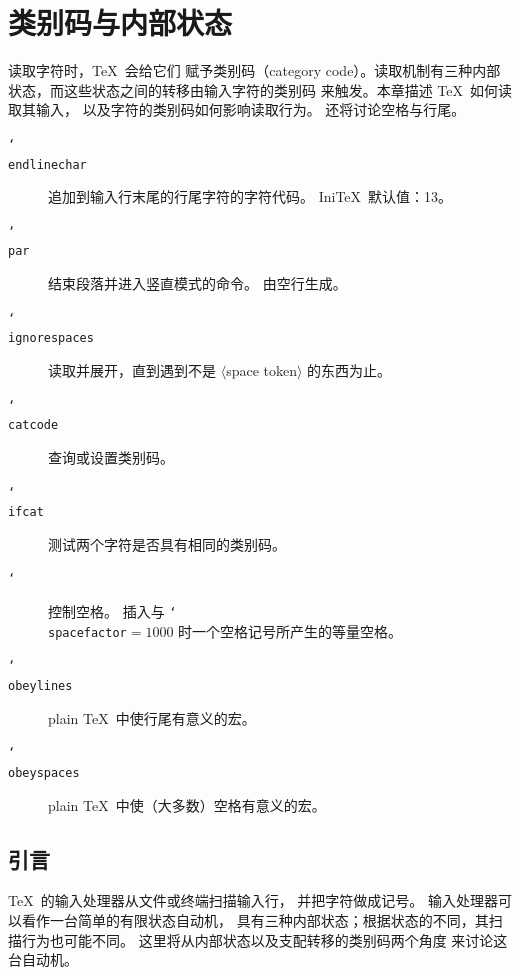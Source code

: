 \documentclass[a4paper]{rapport3}
\def\nl{\protect\\}\def\n#1{{\tt #1}}\def\cs#1{{\tt\char`\\#1}}\let\csc\cs
\def\gr#1{$\langle$#1$\rangle$}\def\key#1{{\tt#1}}
\def\IniTeX{Ini\TeX}\def\LamsTeX{LAMS\TeX}\def\VirTeX{Vir\TeX}
\newenvironment{inventory}{\begin{description}}{\end{description}}
\begin{document}


\endofchapter
\chapter{类别码与内部状态}\label{mouth}

读取字符时，\TeX\ 会给它们
赋予类别码（category code）。读取机制有三种内部
状态，而这些状态之间的转移由输入字符的类别码
来触发。本章描述 \TeX\ 如何读取其输入，
以及字符的类别码如何影响读取行为。
还将讨论空格与行尾。

\begin{inventory}
\item [\cs{endlinechar}]
      追加到输入行末尾的行尾字符的字符代码。
      \IniTeX\ 默认值：13。
\item [\cs{par}]
      结束段落并进入竖直模式的命令。
      由空行生成。

\item [\cs{ignorespaces}]
      读取并展开，直到遇到不是 \gr{space token} 的东西为止。

\item [\cs{catcode}]
      查询或设置类别码。

\item [\cs{ifcat}]
      测试两个字符是否具有相同的类别码。

\item [\cs{}]
      控制空格。
      插入与 \cs{spacefactor}${}=1000$ 时一个空格记号所产生的等量空格。

\item [\cs{obeylines}]
      plain \TeX\ 中使行尾有意义的宏。

\item [\cs{obeyspaces}]
      plain \TeX\ 中使（大多数）空格有意义的宏。
\end{inventory}

\section{引言}

\TeX\ 的输入处理器从文件或终端扫描输入行，
并把字符做成记号。
输入处理器可以看作一台简单的有限状态自动机，
具有三种内部状态；根据状态的不同，其扫描行为也可能不同。
这里将从内部状态以及支配转移的类别码两个角度
来讨论这台自动机。
\end{document}
